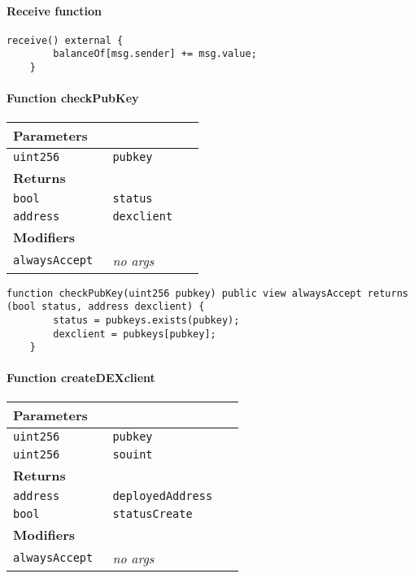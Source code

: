 \paragraph{Receive function}

\vspace{2cm}

\begin{lstlisting}[firstnumber=76]
	receive() external {
		balanceOf[msg.sender] += msg.value;
	}
\end{lstlisting}

\paragraph{Function checkPubKey}


\ifsoltables
\noindent\begin{tabular}{|l|l|p{5cm}|}\hline
\multicolumn{3}{|l|}{\bf Parameters}\\\hline
\tt uint256 & \tt pubkey &\\\hline
\multicolumn{3}{|l|}{\bf Returns}\\\hline
\tt bool & \tt status &\\\hline
\tt address & \tt dexclient &\\\hline
\multicolumn{3}{|l|}{\bf Modifiers}\\\hline
\tt alwaysAccept & {\em no args} &\\\hline
\end{tabular}
\fi

\vspace{2cm}

\begin{lstlisting}[firstnumber=328]
	function checkPubKey(uint256 pubkey) public view alwaysAccept returns (bool status, address dexclient) {
		status = pubkeys.exists(pubkey);
		dexclient = pubkeys[pubkey];
	}
\end{lstlisting}

\paragraph{Function createDEXclient}


\ifsoltables
\noindent\begin{tabular}{|l|l|p{5cm}|}\hline
\multicolumn{3}{|l|}{\bf Parameters}\\\hline
\tt uint256 & \tt pubkey &\\\hline
\tt uint256 & \tt souint &\\\hline
\multicolumn{3}{|l|}{\bf Returns}\\\hline
\tt address & \tt deployedAddress &\\\hline
\tt bool & \tt statusCreate &\\\hline
\multicolumn{3}{|l|}{\bf Modifiers}\\\hline
\tt alwaysAccept & {\em no args} &\\\hline
\end{tabular}
\fi

